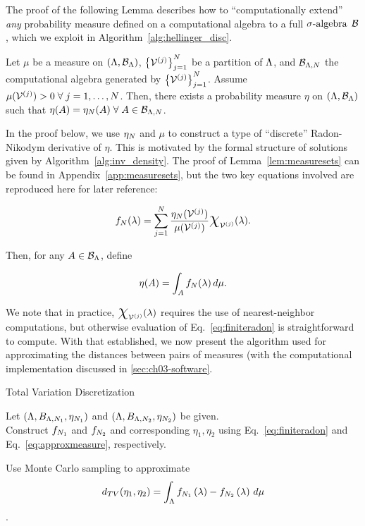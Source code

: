 The proof of the following Lemma describes how to ``computationally extend'' {\em any} probability measure defined on a computational algebra to a full $\sigma\text{-algebra}$ $\mathcal{B}$, which we exploit in Algorithm~\ref{alg:hellinger_disc}.

\begin{lem}
\label{lem:measuresets}
Let $\mu$ be a measure on $({\Lambda}, \mathcal{B}_{\Lambda})$, $\left\{\mathcal{V}^{(j)}\right\}_{j=1}^{N}$ be a partition of ${\Lambda}$, and $\mathcal{B}_{{\Lambda}, N}$ the computational algebra generated by $\left\{\mathcal{V}^{(j)}\right\}_{j=1}^{N}$.
Assume $\mu (\mathcal{V}^{(j)}) > 0 \; \forall \; j=1,\hdots, N$.
Then, there exists a probability measure $\eta$ on $({\Lambda}, \mathcal{B}_{\Lambda})$ such that $\eta(A) = \eta_N(A) \; \forall \; A\in\mathcal{B}_{{\Lambda}, N}$.
\end{lem}
In the proof below, we use $\eta_N$ and $\mu$ to construct a type of ``discrete'' Radon-Nikodym derivative of $\eta$.
This is motivated by the formal structure of solutions given by Algorithm~\ref{alg:inv_density}.
The proof of Lemma~\ref{lem:measuresets} can be found in Appendix~\ref{app:measuresets}, but the two key equations involved are reproduced here for later reference:

\begin{equation}\label{eq:finiteradon}
f_\nsamps (\param) = \sum_{j=1}^{\nsamps} \frac{\eta_\nsamps (\VV^{(j)}) }{\mu (\VV^{(j)})} \Chi_{\VV^{(j)}} (\param).
\end{equation}

Then, for any $A\in\mathcal{B}_{\Lambda}$, define

\begin{equation}\label{eq:approxmeasure}
\eta (A) = \int_A f_N (\lambda) \, d\mu.
\end{equation}

We note that in practice, $\Chi_{\VV^{(j)}} (\param)$ requires the use of nearest-neighbor computations, but otherwise evaluation of Eq.~\eqref{eq:finiteradon} is straightforward to compute.
With that established, we now present the algorithm used for approximating the distances between pairs of measures (with the computational implementation discussed in \ref{sec:ch03-software}.


\begin{algorithm}
\DontPrintSemicolon
\caption{Total Variation Discretization}
\label{alg:totvar_disc}
Let $({\Lambda}, B_{{\Lambda}, N_1}, \eta_{N_1} )$ and $({\Lambda}, B_{{\Lambda}, N_2}, \eta_{N_2} )$ be given.\\

Construct $f_{N_1}$ and $f_{N_2}$ and corresponding $\eta_1, \eta_2$ using Eq.~\eqref{eq:finiteradon} and Eq.~\eqref{eq:approxmeasure}, respectively.

Use Monte Carlo sampling to approximate
$$ d_{TV}(\eta_1, \eta_2) = \int_{\Lambda} f_{N_1}\left ( \lambda \right ) - f_{N_2}\left ( \lambda \right ) \, d\mu $$.
\end{algorithm}

